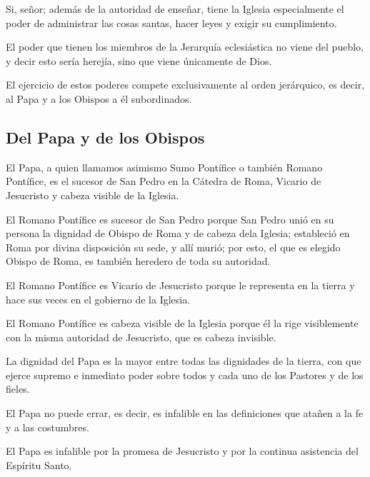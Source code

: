 Si, señor; además de la autoridad de enseñar, tiene la Iglesia especialmente el
poder de administrar las cosas santas, hacer leyes y exigir su cumplimiento.

 El poder que tienen los miembros de la Jerarquía eclesiástica no
viene del pueblo, y decir esto sería herejía, sino que viene únicamente de Dios.

 El ejercicio de estos
poderes compete exclusivamente al orden jerárquico, es decir, al Papa y a los
Obispos a él subordinados.

\subsection{Del Papa y de los Obispos}

 El Papa, a quien llamamos asimismo Sumo Pontífice
o también Romano Pontífice, es el sucesor de San Pedro en la Cátedra de Roma,
Vicario de Jesucristo y cabeza visible de la Iglesia.

 El Romano
Pontífice es sucesor de San Pedro porque San Pedro unió en su persona la
dignidad de Obispo de Roma y de cabeza dela Iglesia; estableció en Roma por
divina disposición su sede, y allí murió; por esto, el que es elegido Obispo de
Roma, es también heredero de toda su autoridad.

 El Romano
Pontífice es Vicario de Jesucristo porque le representa en la tierra y hace sus veces en el gobierno de la Iglesia.

 El
Romano Pontífice es cabeza visible de la Iglesia porque él la rige visiblemente con
la misma autoridad de Jesucristo, que es cabeza invisible.

 La dignidad del Papa es la mayor
entre todas las dignidades de la tierra, con que ejerce supremo e inmediato poder
sobre todos y cada uno de los Pastores y de los fieles.

 El Papa no puede errar, es
decir, es infalible en las definiciones que atañen a la fe y a las costumbres.

 El Papa es infalible por la
promesa de Jesucristo y por la continua asistencia del Espíritu Santo.

